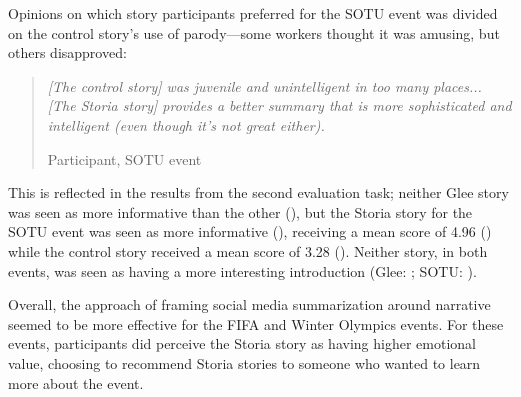 Opinions on which story participants preferred for the SOTU event was divided on the control story's use of parody---some workers thought it was amusing, but others disapproved:

\begin{quote}
\emph{[The control story] was juvenile and unintelligent in too many places... [The Storia story] provides a better summary that is more sophisticated and intelligent (even though it's not great either).}

Participant, SOTU event
\end{quote}

This is reflected in the results from the second evaluation task; neither Glee story was seen as more informative than the other (), but the Storia story for the SOTU event was seen as more informative (), receiving a mean score of 4.96 () while the control story received a mean score of 3.28 (). Neither story, in both events, was seen as having a more interesting introduction (Glee: ; SOTU: ). 







Overall, the approach of framing social media summarization around narrative seemed to be more effective for the FIFA and Winter Olympics events. For these events, participants did perceive the Storia story as having higher emotional value, choosing to recommend Storia stories to someone who wanted to learn more about the event.